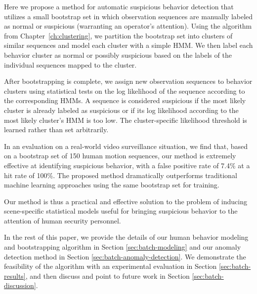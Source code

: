 
Here we propose a method for automatic suspicious behavior detection
that utilizes a small bootstrap set in which observation sequences are
manually labeled as normal or suspicious (warranting an operator's
attention).  Using the algorithm from Chapter~\ref{ch:clustering}, we
partition the bootstrap set into clusters of similar sequences and
model each cluster with a simple HMM. We then label each behavior
cluster as normal or possibly suspicious based on the labels of the
individual sequences mapped to the cluster.

After bootstrapping is complete, we assign new observation sequences
to behavior clusters using statistical tests on the log likelihood of
the sequence according to the corresponding HMMs.  A sequence is
considered suspicious if the most likely cluster is already labeled as
suspicious or if its log likelihood according to the most likely
cluster's HMM is too low.  The cluster-specific likelihood threshold
is learned rather than set arbitrarily.

In an evaluation on a real-world video surveillance situation, we find
that, based on a bootstrap set of 150 human motion sequences, our
method is extremely effective at identifying suspicious behavior, with
a false positive rate of 7.4\% at a hit rate of 100\%.  The proposed
method dramatically outperforms traditional machine learning
approaches using the same bootstrap set for training.

Our method is thus a practical and effective solution to the problem
of inducing scene-specific statistical models useful for bringing
suspicious behavior to the attention of human security personnel.

In the rest of this paper, we provide the details of our human
behavior modeling and bootstrapping algorithm in
Section \ref{sec:batch-modeling} and our anomaly detection method in
Section \ref{sec:batch-anomaly-detection}. We demonstrate the feasibility
of the algorithm with an experimental evaluation in
Section \ref{sec:batch-results}, and then discuss and point to future
work in Section \ref{sec:batch-discussion}.


